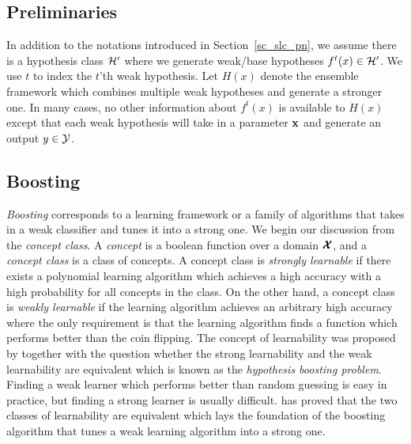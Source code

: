 {%
%
\subsection{Preliminaries} \label{sc_em_pn}

In addition to the notations introduced in Section~\ref{sc_slc_pn}, we assume there is a hypothesis class $\mathcal{H}'$ where we generate weak/base hypotheses $f^t(x)\in\mathcal{H}'$.
We use $t$ to index the $t$'th weak hypothesis.
Let $H(x)$ denote the ensemble framework which combines multiple weak hypotheses and generate a stronger one.
In many cases, no other information about $f^t(x)$ is available to $H(x)$ except that each weak hypothesis will take in a parameter $\mathbf {x}$ and generate an output $y\in\mathcal{Y}$.


\subsection{Boosting} \label{sc_boosting}

\textit{Boosting} corresponds to a learning framework or a family of algorithms that takes in a weak classifier and tunes it into a strong one.
We begin our discussion from the \textit{concept class}.
A \textit{concept} is a boolean function over a domain $\pmb {\mathcal{X}}$, and a \textit{concept class} is a class of concepts.
A concept class is \textit{strongly learnable} if there exists a polynomial learning algorithm which achieves a high accuracy with a high probability for all concepts in the class.
On the other hand, a concept class is \textit{weakly learnable} if the learning algorithm achieves an arbitrary high accuracy where the only requirement is that the learning algorithm finds a function which performs better than the coin flipping.
The concept of learnability was proposed by \citet{Kearns94cryptographic} together with the question whether the strong learnability and the weak learnability are equivalent which is known as the \textit{hypothesis boosting problem}.
Finding a weak learner which performs better than random guessing is easy in practice, but finding a strong learner is usually difficult.
\citet{Schapire90the} has proved that the two classes of learnability are equivalent which lays the foundation of the boosting algorithm that tunes a weak learning algorithm into a strong one.

}
